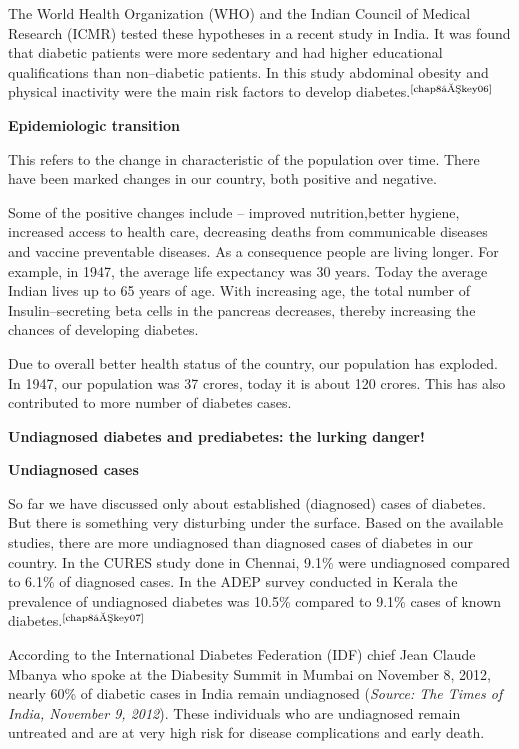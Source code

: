 The World Health Organization (WHO) and the Indian Council of Medical Research (ICMR) tested these hypotheses in a recent study in India. It was found that diabetic patients were more sedentary and had higher educational qualifications than non–diabetic patients. In this study abdominal obesity and physical inactivity were the main risk factors to develop diabetes.$^{\text{\cite{chap8–key06}}}$

\vskip 8pt
\noindent\textbf{Epidemiologic transition}

\vskip 8pt
This refers to the change in characteristic of the population over time. There have been marked changes in our country, both positive and negative.

Some of the positive changes include – improved nutrition,\break better hygiene, increased access to health care, decreasing deaths from communicable diseases and vaccine preventable diseases. As a consequence people are living longer. For example, in 1947, the ave\-rage life expectancy was 30 years. Today the average Indian lives up to 65 years of age. With increasing age, the total number of Insulin–secreting beta cells in the pancreas decreases, thereby increasing the chances of deve\-loping diabetes.

Due to overall better health status of the country, our population has exploded. In 1947, our population was 37 crores, today it is about 120 crores. This has also contributed to more number of diabetes cases.

\vskip 6pt
\noindent\textbf{Undiagnosed diabetes and prediabetes: the lurking danger!}

\vskip 6pt
\noindent\textbf{Undiagnosed cases}

So far we have discussed only about established (diagnosed) cases of diabetes. But there is something very disturbing under the surface. Based on the available studies, there are more undiagnosed than dia\-gnosed cases of diabetes in our country. In the CURES study done in Chennai, 9.1\% were undiagnosed compared to 6.1\% of diagnosed cases. In the ADEP survey conducted in Kerala the prevalence of undiagnosed diabetes was 10.5\% compared to 9.1\% cases of known diabetes.$^{\text{\cite{chap8–key07}}}$

According to the International Diabetes Federation (IDF) chief Jean Claude Mbanya who spoke at the Diabesity Summit in Mumbai on Nove\-mber 8, 2012, nearly 60\% of diabetic cases in India remain undiagnosed (\textit{Source: The Times of India, November 9, 2012}). These individuals who are undiagnosed remain untreated and are at very high risk for disease complications and early death.

